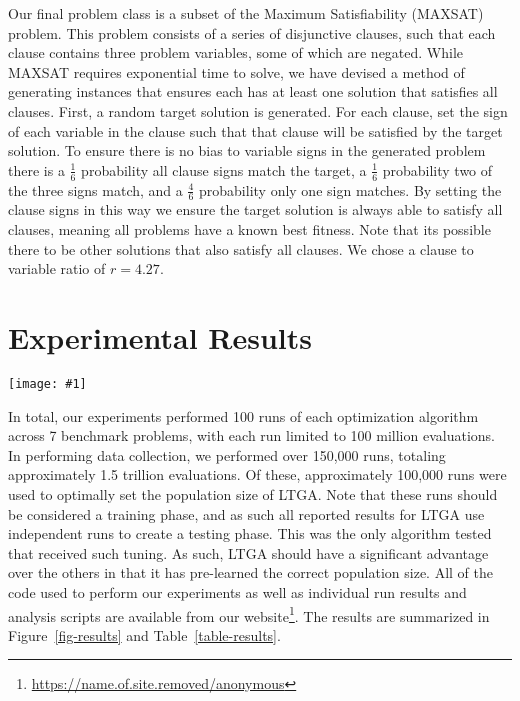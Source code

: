 \documentclass{sig-alternate}
\newcommand{\includegraphicswide}[1]
{\texttt{[image: \#1]}}
\begin{document}
Our final problem class is a subset of the Maximum Satisfiability (MAXSAT) problem.
This problem consists of a series of disjunctive clauses, such that each clause contains
three problem variables, some of which are negated. While
MAXSAT requires exponential time to solve, we have devised a method of generating
instances that ensures each has at least one solution that satisfies all clauses.
First, a random target solution is generated.  For each clause, set the sign of each
variable in the clause such that that clause will be satisfied by the target solution.
To ensure there is no bias to variable signs in the generated problem there is a $\frac{1}{6}$ probability
all clause signs match the target, a $\frac{1}{6}$ probability two of the three signs match,
and a $\frac{4}{6}$ probability only one sign matches.  By setting the clause signs
in this way we ensure the target solution is always able to satisfy all clauses,
meaning all problems have a known best fitness.  Note that its possible there to be
other solutions that also satisfy all clauses.  We chose a clause to variable ratio
of $r=4.27$.

\section{Experimental Results}
\begin{figure*}
  \centering
  \includegraphicswide{WithRast}
  \caption{Comparison of the median number of evaluations to reach the global optimum for
           the four different optimization methods on seven benchmark problems with respect
           to problem size.  If the median run did not reach the global optimum no point
           is drawn.  Results given on a log-log scale.}
  \label{fig-results}
\end{figure*}

In total, our experiments performed 100 runs of each optimization algorithm across
7 benchmark problems, with each run limited to 100 million evaluations.
In performing data collection, we performed over 150,000 runs, totaling approximately
1.5 trillion evaluations.  Of these, approximately 100,000 runs were used to optimally
set the population size of LTGA.  Note that these runs should be considered a training phase,
and as such all reported results for LTGA use independent runs to create a testing phase.
This was the only algorithm tested that received such tuning.  As such, LTGA should have a significant
advantage over the others in that it has pre-learned the correct population size.
All of the code used to perform our experiments
as well as individual run results and analysis scripts are available from our
website\footnote{\url{https://name.of.site.removed/anonymous}}.  The results
are summarized in Figure~\ref{fig-results} and Table~\ref{table-results}.
\end{document}
